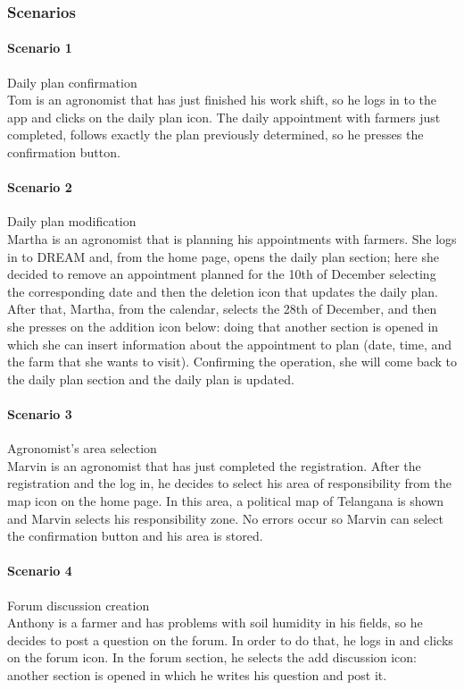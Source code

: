 \bigskip
\subsubsection{Scenarios}
\paragraph{Scenario 1} Daily plan confirmation\\
Tom is an agronomist that has just finished his work shift, so he logs in to the app and clicks on the daily plan icon.
The daily appointment with farmers just completed, follows exactly the plan previously determined, so he presses the
confirmation button.

\bigskip
\paragraph{Scenario 2} Daily plan modification\\
Martha is an agronomist that is planning his appointments with farmers. She logs in to DREAM and, from the home page,
opens the daily plan section; here she decided to remove an appointment planned for the 10th of December selecting the
corresponding date and then the deletion icon that updates the daily plan. After that, Martha, from the calendar,
selects the 28th of December, and then she presses on the addition icon below: doing that another section is opened in
which she can insert information about the appointment to plan (date, time, and the farm that she wants to visit).
Confirming the operation, she will come back to the daily plan section and the daily plan is updated.

\bigskip
\paragraph{Scenario 3} Agronomist's area selection\\
Marvin is an agronomist that has just completed the registration. After the registration and the log in,
he decides to select his area of responsibility from the map icon on the home page. In this area, a political map of
Telangana is shown and Marvin selects his responsibility zone. No errors occur so Marvin can select the confirmation
button and his area is stored.

\bigskip
\paragraph{Scenario 4} Forum discussion creation\\
Anthony is a farmer and has problems with soil humidity in his fields, so he decides to post a question on the forum.
In order to do that, he logs in and clicks on the forum icon. In the forum section, he selects the add discussion icon:
another section is opened in which he writes his question and post it.

